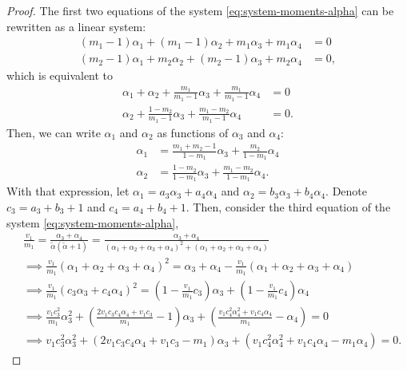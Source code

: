 \begin{proof}
  

The first two equations of the system \eqref{eq:system-moments-alpha} can be
rewritten as a linear system:
\begin{align*}
  (m_1 - 1)\alpha_1 + (m_1 - 1)\alpha_2 + m_1\alpha_3 + m_1\alpha_4 &= 0 \\
  (m_2 - 1)\alpha_1 + m_2\alpha_2 + (m_2-1)\alpha_3 + m_2\alpha_4 &= 0,   
\end{align*}
which is equivalent to 
\begin{align*}
  \alpha_1 + \alpha_2 + \frac{m_1}{m_1-1}\alpha_3 + \frac{m_1}{m_1-1}\alpha_4 &= 0 \\
  \alpha_2 + \frac{1-m_2}{m_1-1}\alpha_3 + \frac{m_1-m_2}{m_1-1}\alpha_4 &= 0.
\end{align*}
Then, we can write $\alpha_1$ and $\alpha_2$ as functions of $\alpha_3$ and
$\alpha_4$:
\begin{align}
  \alpha_1 &= \frac{m_1+m_2-1}{1-m_1}\alpha_3 + \frac{m_2}{1-m_1}\alpha_4 \\
  \alpha_2 &= \frac{1-m_2}{1-m_1}\alpha_3 + \frac{m_1-m_2}{1-m_1}\alpha_4.
\end{align}
With that expression, let $\alpha_1 = a_3\alpha_3 + a_4\alpha_4$ and $\alpha_2
= b_3\alpha_3 + b_4\alpha_4$. Denote $c_3 = a_3 + b_3 + 1$ and $c_4 = a_4 +
b_4 + 1$. Then, consider the third equation of the system
\eqref{eq:system-moments-alpha}, 
\begin{equation*}
  \begin{split}
    &\frac{v_1}{m_1} = \frac{\alpha_3+\alpha_4}{\tilde{\alpha}(\tilde{\alpha} +1)} = \frac{\alpha_3+\alpha_4}{(\alpha_1+\alpha_2+\alpha_3+\alpha_4)^2 + (\alpha_1+\alpha_2+\alpha_3+\alpha_4)} \\
     &\implies \frac{v_1}{m_1}(\alpha_1 + \alpha_2 + \alpha_3 + \alpha_4)^2 = \alpha_3 + \alpha_4 - \frac{v_1}{m_1}(\alpha_1 + \alpha_2 + \alpha_3 + \alpha_4) \\
    &\implies \frac{v_1}{m_1}(c_3\alpha_3 + c_4\alpha_4)^2 = \left(1-\frac{v_1}{m_1}c_3\right)\alpha_3 + \left(1-\frac{v_1}{m_1}c_4\right)\alpha_4 \\
    &\implies \frac{v_1c_3^2}{m_1}\alpha_3^2 + \left(\frac{2v_1c_3c_4\alpha_4+v_1c_3}{m_1} - 1\right)\alpha_3 + \left(\frac{v_1c_4^2\alpha_4^2 + v_1c_4\alpha_4}{m_1} - \alpha_4\right) = 0 \\ 
    &\implies v_1c_3^2\alpha_3^2 + (2v_1c_3c_4\alpha_4+v_1c_3 - m_1)\alpha_3 + (v_1c_4^2\alpha_4^2 + v_1c_4\alpha_4 - m_1\alpha_4) = 0.
  \end{split}

\end{equation*}
\end{proof}
